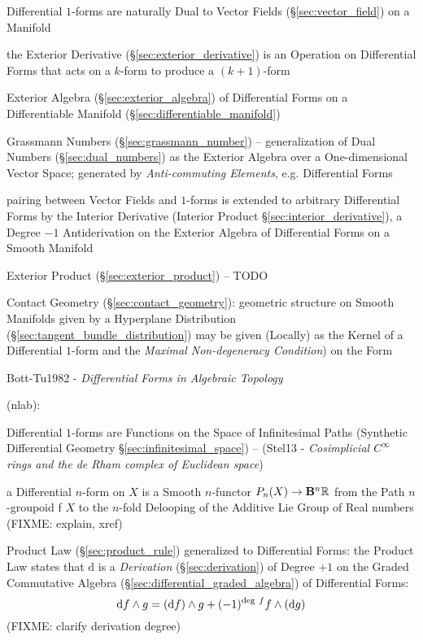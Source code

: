 Differential $1$-forms are naturally Dual to Vector Fields
(\S\ref{sec:vector_field}) on a Manifold

the Exterior Derivative (\S\ref{sec:exterior_derivative}) is an Operation on
Differential Forms that acts on a $k$-form to produce a $(k+1)$-form

Exterior Algebra (\S\ref{sec:exterior_algebra}) of Differential Forms on a
Differentiable Manifold (\S\ref{sec:differentiable_manifold})

\fist Grassmann Numbers (\S\ref{sec:grassmann_number}) -- generalization of Dual
Numbers (\S\ref{sec:dual_numbers}) as the Exterior Algebra over a
One-dimensional Vector Space; generated by \emph{Anti-commuting Elements}, e.g.
Differential Forms

pairing between Vector Fields and $1$-forms is extended to arbitrary
Differential Forms by the Interior Derivative (Interior Product
\S\ref{sec:interior_derivative}), a Degree $-1$ Antiderivation on the Exterior
Algebra of Differential Forms on a Smooth Manifold

Exterior Product (\S\ref{sec:exterior_product}) -- TODO

\fist Contact Geometry (\S\ref{sec:contact_geometry}): geometric structure on
Smooth Manifolds given by a Hyperplane Distribution
(\S\ref{sec:tangent_bundle_distribution}) may be given (Locally) as the Kernel
of a Differential $1$-form and the \emph{Maximal Non-degeneracy Condition}) on
the Form

Bott-Tu1982 - \emph{Differential Forms in Algebraic Topology}

(nlab):

Differential $1$-forms are Functions on the Space of Infinitesimal Paths
(Synthetic Differential Geometry \S\ref{sec:infinitesimal_space}) -- (Stel13 -
\emph{Cosimplicial $C^\infty$ rings and the de Rham complex of Euclidean space})

a Differential $n$-form on $X$ is a Smooth $n$-functor $P_n(X) \rightarrow
\mathbf{B}^n\mathbb{R}$ from the Path $n$-groupoid f $X$ to the $n$-fold Delooping
of the Additive Lie Group of Real numbers (FIXME: explain, xref)

Product Law (\S\ref{sec:product_rule}) generalized to Differential Forms: the
Product Law states that $\mathrm{d}$ is a \emph{Derivation}
(\S\ref{sec:derivation}) of Degree $+1$ on the Graded Commutative Algebra
(\S\ref{sec:differential_graded_algebra}) of Differential Forms:
\[
\mathrm{d}f \wedge g = (\mathrm{d}f) \wedge g +
  (-1)^{\mathrm{deg}\ f}f \wedge (\mathrm{d}g)
\]
(FIXME: clarify derivation degree)

